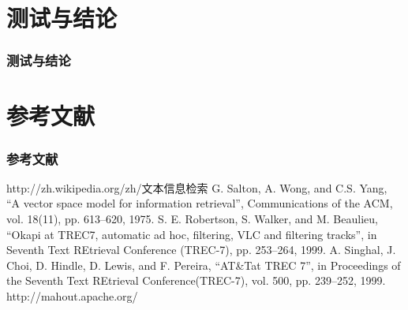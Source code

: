 \documentclass[CJKutf8, table]{beamer}
\begin{document}
\begin{CJK}{UTF8}{gbsn}
\begin{frame}
\end{frame}

\section{测试与结论}
\begin{frame}
  \frametitle{测试与结论}
\end{frame}

\section{参考文献}
\begin{frame}
  \frametitle{参考文献}
  \begin{tiny}
  \begin{thebibliography}{99}
    http://zh.wikipedia.org/zh/文本信息检索
    G. Salton, A. Wong, and C.S. Yang, ``A
      vector space model for information retrieval'', Communications of the ACM,
      vol. 18(11), pp. 613–620, 1975.
    S. E. Robertson, S. Walker, and M.
      Beaulieu, ``Okapi at TREC7, automatic ad hoc, filtering, VLC and filtering
      tracks'', in Seventh Text REtrieval Conference (TREC-7), pp. 253–264, 1999.
    A. Singhal, J. Choi, D. Hindle, D. Lewis,
      and F. Pereira, ``AT\&Tat TREC 7'', in Proceedings of the Seventh Text
      REtrieval Conference(TREC-7), vol. 500, pp. 239–252, 1999.
    http://mahout.apache.org/
  \end{thebibliography}
  \end{tiny}
\end{frame}

\end{CJK}
\end{document}
